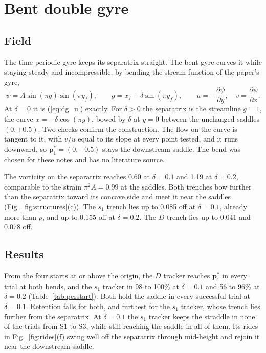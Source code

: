 \documentclass[11pt]{article}
\newcommand{\Dtr}{$D$ tracker}
\newcommand{\Str}{$s_1$ tracker}
\begin{document}
\section{Bent double gyre}
\label{sec:bent_notes}

\subsection{Field}

The time-periodic gyre keeps its separatrix straight. The bent gyre curves
it while staying steady and incompressible, by bending the stream function
of the paper's gyre,
\begin{equation}
    \psi = A\sin(\pi g)\sin(\pi y_f), \qquad
    g = x_f + \delta\sin(\pi y_f), \qquad
    u = -\frac{\partial\psi}{\partial y}, \quad
    v = \frac{\partial\psi}{\partial x}.
    \label{eq:bent}
\end{equation}
At $\delta = 0$ it is (\ref{eq:dg_u}) exactly. For $\delta > 0$ the
separatrix is the streamline $g = 1$, the curve $x = -\delta\cos(\pi y)$,
bowed by $\delta$ at $y = 0$ between the unchanged saddles $(0, \pm 0.5)$.
Two checks confirm the construction. The flow on the curve is tangent to
it, with $v/u$ equal to its slope at every point tested, and it runs
downward, so $\mathbf{p}^*_1 = (0, -0.5)$ stays the downstream saddle.
The bend was chosen for these notes and has no literature source.

The vorticity on the separatrix reaches 0.60 at $\delta = 0.1$ and 1.19 at
$\delta = 0.2$, comparable to the strain $\pi^2 A = 0.99$ at the saddles.
Both trenches bow further than the separatrix toward its concave side and
meet it near the saddles (Fig.~\ref{fig:structures}(c)). The $s_1$ trench
lies up to 0.085 off at $\delta = 0.1$, already more than $\rho$, and up
to 0.155 off at $\delta = 0.2$. The $D$ trench lies up to 0.041 and 0.078
off.

\subsection{Results}

From the four starts at or above the origin, the \Dtr{} reaches
$\mathbf{p}^*_1$ in every trial at both bends, and the \Str{} in 98 to
100\% at $\delta = 0.1$ and 56 to 96\% at $\delta = 0.2$
(Table~\ref{tab:perstart}). Both hold the saddle in every successful trial
at $\delta = 0.1$. Retention falls for both, and furthest for the \Str{},
whose trench lies further from the separatrix. At $\delta = 0.1$ the
\Str{} keeps the straddle in none of the trials from S1 to S3, while still
reaching the saddle in all of them. Its rides in Fig.~\ref{fig:rides}(f)
swing well off the separatrix through mid-height and rejoin it near the
downstream saddle.
\end{document}

